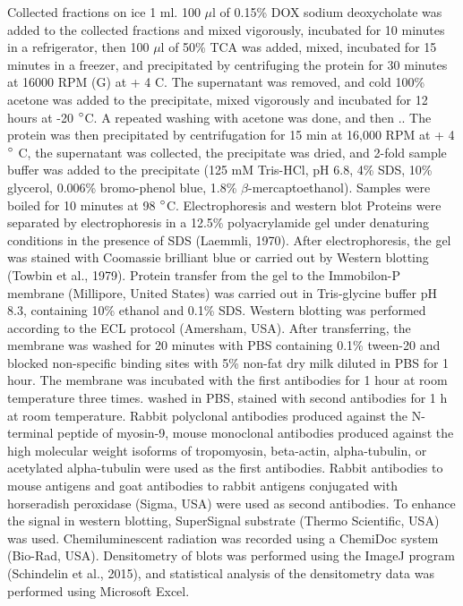 \documentclass[a4paper,12pt]{article}
\begin{document}
Collected fractions on ice 1 ml.
100 $\mu$l of 0.15\% DOX sodium deoxycholate was added to the collected fractions and mixed vigorously, incubated for 10 minutes in a refrigerator, then 100 $\mu$l of 50\% TCA was added, mixed, incubated for 15 minutes in a freezer, and precipitated by centrifuging the protein for 30 minutes at 16000 RPM (G) at + 4 C.
The supernatant was removed, and cold 100\% acetone was added to the precipitate, mixed vigorously and incubated for 12 hours at -20 $\degree$C. A repeated washing with acetone was done, and then ..
The protein was then precipitated by centrifugation for 15 min at 16,000 RPM at + 4 $\degree$ C, the supernatant was collected, the precipitate was dried, and 2-fold sample buffer was added to the precipitate (125 mM Tris-HCl, pH 6.8, 4\% SDS, 10\% glycerol, 0.006\% bromo-phenol blue, 1.8\% $\beta$-mercaptoethanol).
Samples were boiled for 10 minutes at 98 $\degree$C.
Electrophoresis and western blot
Proteins were separated by electrophoresis in a 12.5\%  polyacrylamide gel under denaturing conditions in the presence of SDS (Laemmli, 1970).
After electrophoresis, the gel was stained with Coomassie brilliant blue or carried out by Western blotting (Towbin et al., 1979).
Protein transfer from the gel to the Immobilon-P membrane (Millipore, United States) was carried out in Tris-glycine buffer pH 8.3, containing 10\% ethanol and 0.1\% SDS.
Western blotting was performed according to the ECL protocol (Amersham, USA).
After transferring, the membrane was washed for 20 minutes with PBS containing 0.1\% tween-20 and blocked non-specific binding sites with 5\% non-fat dry milk diluted in PBS for 1 hour.
The membrane was incubated with the first antibodies for 1 hour at room temperature three times. washed in PBS, stained with second antibodies for 1 h at room temperature. Rabbit polyclonal antibodies produced against the N-terminal peptide of myosin-9, mouse monoclonal antibodies produced against the high molecular weight isoforms of tropomyosin, beta-actin, alpha-tubulin, or acetylated alpha-tubulin were used as the first antibodies.
Rabbit antibodies to mouse antigens and goat antibodies to rabbit antigens conjugated with horseradish peroxidase (Sigma, USA) were used as second antibodies.
To enhance the signal in western blotting, SuperSignal substrate (Thermo Scientific, USA) was used.
Chemiluminescent radiation was recorded using a ChemiDoc system (Bio-Rad, USA).
Densitometry of blots was performed using the ImageJ program (Schindelin et al., 2015), and statistical analysis of the densitometry data was performed using Microsoft Excel.
\end{document}
